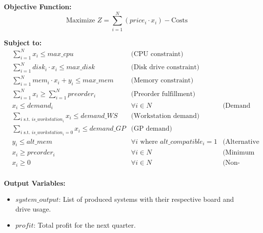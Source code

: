 \documentclass{article}
\begin{document}
\textbf{Objective Function:}
\[
\text{Maximize } Z = \sum_{i=1}^{N} (price_i \cdot x_i) - \text{Costs}
\]

\textbf{Subject to:}
\begin{align*}
    & \sum_{i=1}^{N} x_i \leq max\_cpu & \text{(CPU constraint)} \\
    & \sum_{i=1}^{N} disk_i \cdot x_i \leq max\_disk & \text{(Disk drive constraint)} \\
    & \sum_{i=1}^{N} mem_i \cdot x_i + y_i \leq max\_mem & \text{(Memory constraint)} \\
    & \sum_{i=1}^{N} x_i \geq \sum_{i=1}^{N} preorder_i & \text{(Preorder fulfillment)} \\
    & x_i \leq demand_i & \forall i \in N & \text{(Demand constraint for each system)} \\
    & \sum_{i \text{ s.t. } is\_workstation_i} x_i \leq demand\_WS & \text{(Workstation demand)} \\
    & \sum_{i \text{ s.t. } is\_workstation_i=0} x_i \leq demand\_GP & \text{(GP demand)} \\
    & y_i \leq alt\_mem & \forall i \text{ where } alt\_compatible_i=1 & \text{(Alternative memory board allocation)} \\
    & x_i \geq preorder_i & \forall i \in N & \text{(Minimum production for preorders)} \\
    & x_i \geq 0 & \forall i \in N & \text{(Non-negativity)} \\
\end{align*}

\textbf{Output Variables:}
\begin{itemize}
    \item $system\_output$: List of produced systems with their respective board and drive usage.
    \item $profit$: Total profit for the next quarter.
\end{itemize}
\end{document}
